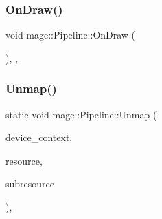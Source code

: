 \subsubsection{\texorpdfstring{On\+Draw()}{OnDraw()}}
{\footnotesize\ttfamily void mage\+::\+Pipeline\+::\+On\+Draw (\begin{DoxyParamCaption}{ }\end{DoxyParamCaption})\hspace{0.3cm}{\ttfamily [static]}, {\ttfamily [private]}, {\ttfamily [noexcept]}}

\hypertarget{structmage_1_1_pipeline_a12430259f4e0c73fe770a87e17a4eb5b}{}\label{structmage_1_1_pipeline_a12430259f4e0c73fe770a87e17a4eb5b} 
\subsubsection{\texorpdfstring{Unmap()}{Unmap()}}
{\footnotesize\ttfamily static void mage\+::\+Pipeline\+::\+Unmap (\begin{DoxyParamCaption}\item[{I\+D3\+D11\+Device\+Context4 $\ast$}]{device\+\_\+context,  }\item[{I\+D3\+D11\+Resource $\ast$}]{resource,  }\item[{\hyperlink{namespacemage_a41c104c036fba3756a74e19f793eeaa1}{U32}}]{subresource }\end{DoxyParamCaption})\hspace{0.3cm}{\ttfamily [static]}, {\ttfamily [noexcept]}}

\hypertarget{structmage_1_1_pipeline_a8d0b596b3a5e3729618053f45e9467d5}{}\label{structmage_1_1_pipeline_a8d0b596b3a5e3729618053f45e9467d5} 
